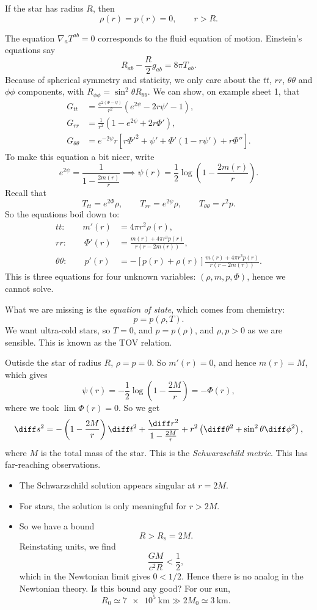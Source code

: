 \documentclass[12pt]{article}
\begin{document}
If the star has radius $R$, then
\[
\rho(r) = p(r) = 0, \qquad r > R.
\]


The equation $\nabla_a T^{ab} = 0$ corresponds to the fluid equation of motion. Einstein's equations say
\[
R_{ab} - \frac{R}{2} g_{ab} = 8 \pi T_{ab}.
\]
Because of spherical symmetry and staticity, we only care about the $tt$, $rr$, $\theta\theta$ and $\phi\phi$ components, with $R_{\phi\phi} = \sin^2\theta R_{\theta\theta}$. We can show, on example sheet 1, that
\begin{align*}
	G_{tt} &= \frac{e^{2(\Phi - \psi)}}{r^2} (e^{2 \psi} - 2 r \psi' - 1), \\
	G_{rr} &= \frac{1}{r^2} (1 - e^{2 \psi} + 2 r \Phi'), \\
	G_{\theta\theta} &= e^{-2 \psi} r [ r \Phi'^2 + \psi' + \Phi'(1 - r \psi') + r \Phi''].
\end{align*}
To make this equation a bit nicer, write
\[
e^{2\psi} = \frac{1}{1 - \frac{2m(r)}{r}} \implies \psi(r) = \frac{1}{2} \log \left(1 - \frac{2m(r)}{r} \right).
\]
Recall that
\[
	T_{tt} = e^{2 \Phi}\rho, \qquad T_{rr} = e^{2\psi} \rho, \qquad T_{\theta\theta} = r^2 p.
\]
So the equations boil down to:
\begin{align*}
	tt: \qquad m'(r) &= 4 \pi r^2 \rho(r), \\
	rr: \qquad \Phi'(r) &= \frac{m(r) + 4 \pi r^3 p(r)}{r(r - 2m(r))}, \\
	\theta\theta: \qquad p'(r) &= - [p(r) + \rho(r)] \frac{m(r) + 4 \pi r^3 p(r)}{r(r - 2m(r))}.
\end{align*}
This is three equations for four unknown variables: $(\rho, m, p, \Phi)$, hence we cannot solve.

What we are missing is the \emph{equation of state}, which comes from chemistry:
\[
p = p(\rho, T).
\]
We want ultra-cold stars, so $T = 0$, and $p = p(\rho)$, and $\rho, p > 0$ as we are sensible. This is known as the TOV relation.

Outisde the star of radius $R$, $\rho = p = 0$. So $m'(r) = 0$, and hence $m(r) = M$, which gives
\[
\psi(r) = - \frac 12 \log \left(1 - \frac{2M}{r} \right) = - \Phi(r),
\]
where we took $\lim \Phi(r) = 0$. So we get
\[
\diff s^2 = - \left( 1 - \frac{2M}{r} \right) \diff t^2 + \frac{\diff r^2}{1 - \frac{2M}{r}} + r^2\left(\diff \theta^2 + \sin^2 \theta \diff \phi^2 \right),
\]
where $M$ is the total mass of the star. This is the \emph{Schwarzschild metric}. This has far-reaching observations.
\begin{itemize}
	\item The Schwarzschild solution appears singular at $r = 2M$.
	\item For stars, the solution is only meaningful for $r > 2M$.
	\item So we have a bound
		\[
		R > R_s = 2M.
		\]
		Reinstating units, we find
		\[
		\frac{GM}{c^2 R} < \frac{1}{2},
		\]
		which in the Newtonian limit gives $0 < 1/2$. Hence there is no analog in the Newtonian theory. Is this bound any good? For our sun,
		\[
			R_{0} \simeq \qty{7e5}{\kilo\meter} \gg 2 M_0 \simeq \qty{3}{\kilo\meter}.
		\]
\end{itemize}
\end{document}
